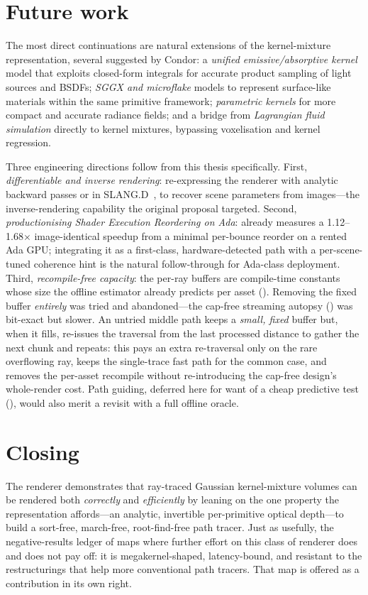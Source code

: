 \section{Future work}
\label{sec:future-work}

The most direct continuations are natural extensions of the kernel-mixture representation, several
suggested by Condor: a \emph{unified emissive/absorptive kernel} model that exploits closed-form
integrals for accurate product sampling of light sources and BSDFs; \emph{SGGX and microflake} models
to represent surface-like materials within the same primitive framework; \emph{parametric kernels} for
more compact and accurate radiance fields; and a bridge from \emph{Lagrangian fluid simulation} directly
to kernel mixtures, bypassing voxelisation and kernel regression.

Three engineering directions follow from this thesis specifically. First, \emph{differentiable and
inverse rendering}: re-expressing the renderer with analytic backward passes or in
SLANG.D~\cite{SLANG.D}, to recover scene parameters from images---the inverse-rendering capability the
original proposal targeted. Second, \emph{productionising Shader Execution Reordering on Ada}:
 already measures a \num{1.12}--\num{1.68}$\times$ image-identical speedup from a minimal
per-bounce reorder on a rented Ada GPU; integrating it as a first-class, hardware-detected path with a
per-scene-tuned coherence hint is the natural follow-through for Ada-class deployment. Third, \emph{recompile-free capacity}: the per-ray buffers are compile-time constants whose size the
offline estimator already predicts per asset (). Removing the fixed buffer
\emph{entirely} was tried and abandoned---the cap-free streaming autopsy () was
bit-exact but slower. An untried middle path keeps a \emph{small, fixed} buffer but, when it fills,
re-issues the traversal from the last processed distance to gather the next chunk and repeats: this pays
an extra re-traversal only on the rare overflowing ray, keeps the single-trace fast path for the common
case, and removes the per-asset recompile without re-introducing the cap-free design's whole-render
cost. Path guiding, deferred here for want of a cheap
predictive test (), would also merit a revisit with a full offline oracle.

\section{Closing}
\label{sec:closing}

The renderer demonstrates that ray-traced Gaussian kernel-mixture volumes can be rendered both
\emph{correctly} and \emph{efficiently} by leaning on the one property the representation affords---an
analytic, invertible per-primitive optical depth---to build a sort-free, march-free, root-find-free path
tracer. Just as usefully, the negative-results ledger of  maps where further
effort on this class of renderer does and does not pay off: it is megakernel-shaped, latency-bound, and
resistant to the restructurings that help more conventional path tracers. That map is offered as a
contribution in its own right.
